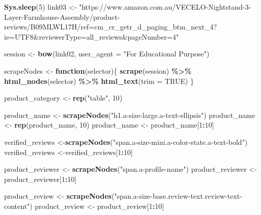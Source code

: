 \documentclass[
]{article}
\newenvironment{Shaded}{\begin{snugshade}}{\end{snugshade}}
\newcommand{\AttributeTok}[1]{\textcolor[rgb]{0.13,0.29,0.53}{#1}}
\newcommand{\ConstantTok}[1]{\textcolor[rgb]{0.56,0.35,0.01}{#1}}
\newcommand{\ControlFlowTok}[1]{\textcolor[rgb]{0.13,0.29,0.53}{\textbf{#1}}}
\newcommand{\DecValTok}[1]{\textcolor[rgb]{0.00,0.00,0.81}{#1}}
\newcommand{\FunctionTok}[1]{\textcolor[rgb]{0.13,0.29,0.53}{\textbf{#1}}}
\newcommand{\NormalTok}[1]{#1}
\newcommand{\OtherTok}[1]{\textcolor[rgb]{0.56,0.35,0.01}{#1}}
\newcommand{\SpecialCharTok}[1]{\textcolor[rgb]{0.81,0.36,0.00}{\textbf{#1}}}
\newcommand{\StringTok}[1]{\textcolor[rgb]{0.31,0.60,0.02}{#1}}
\begin{document}
\begin{Shaded}
\begin{Highlighting}[]
   \FunctionTok{Sys.sleep}\NormalTok{(}\DecValTok{5}\NormalTok{)}
\NormalTok{link03 }\OtherTok{\textless{}{-}} \StringTok{"https://www.amazon.com.au/VECELO{-}Nightstand{-}3{-}Layer{-}Farmhouse{-}Assembly/product{-}reviews/B09MLWL17H/ref=cm\_cr\_getr\_d\_paging\_btm\_next\_4?ie=UTF8\&reviewerType=all\_reviews\&pageNumber=4"}


\NormalTok{  session }\OtherTok{\textless{}{-}} \FunctionTok{bow}\NormalTok{(link02,}
               \AttributeTok{user\_agent =} \StringTok{"For Educational Purpose"}\NormalTok{)}

\NormalTok{  scrapeNodes }\OtherTok{\textless{}{-}} \ControlFlowTok{function}\NormalTok{(selector)\{}
    \FunctionTok{scrape}\NormalTok{(session) }\SpecialCharTok{\%\textgreater{}\%}
      \FunctionTok{html\_nodes}\NormalTok{(selector) }\SpecialCharTok{\%\textgreater{}\%}
      \FunctionTok{html\_text}\NormalTok{(}\AttributeTok{trim =} \ConstantTok{TRUE}\NormalTok{)}
\NormalTok{  \}}

\NormalTok{  product\_category }\OtherTok{\textless{}{-}} \FunctionTok{rep}\NormalTok{(}\StringTok{"table"}\NormalTok{, }\DecValTok{10}\NormalTok{)}

\NormalTok{  product\_name }\OtherTok{\textless{}{-}} \FunctionTok{scrapeNodes}\NormalTok{(}\StringTok{"h1.a{-}size{-}large.a{-}text{-}ellipsis"}\NormalTok{)}
\NormalTok{  product\_name }\OtherTok{\textless{}{-}} \FunctionTok{rep}\NormalTok{(product\_name, }\DecValTok{10}\NormalTok{)}
\NormalTok{  product\_name }\OtherTok{\textless{}{-}}\NormalTok{ product\_name[}\DecValTok{1}\SpecialCharTok{:}\DecValTok{10}\NormalTok{]}
  
\NormalTok{  verified\_reviews }\OtherTok{\textless{}{-}}\FunctionTok{scrapeNodes}\NormalTok{(}\StringTok{"span.a{-}size{-}mini.a{-}color{-}state.a{-}text{-}bold"}\NormalTok{)}
\NormalTok{  verified\_reviews }\OtherTok{\textless{}{-}}\NormalTok{verified\_reviews[}\DecValTok{1}\SpecialCharTok{:}\DecValTok{10}\NormalTok{]}
  
\NormalTok{  product\_reviewer }\OtherTok{\textless{}{-}} \FunctionTok{scrapeNodes}\NormalTok{(}\StringTok{"span.a{-}profile{-}name"}\NormalTok{)}
\NormalTok{  product\_reviewer }\OtherTok{\textless{}{-}}\NormalTok{ product\_reviewer[}\DecValTok{1}\SpecialCharTok{:}\DecValTok{10}\NormalTok{]}
  
\NormalTok{  product\_review }\OtherTok{\textless{}{-}} \FunctionTok{scrapeNodes}\NormalTok{(}\StringTok{"span.a{-}size{-}base.review{-}text.review{-}text{-}content"}\NormalTok{)}
\NormalTok{  product\_review }\OtherTok{\textless{}{-}}\NormalTok{ product\_review[}\DecValTok{1}\SpecialCharTok{:}\DecValTok{10}\NormalTok{]}
  

\end{Highlighting}
\end{Shaded}
\end{document}
